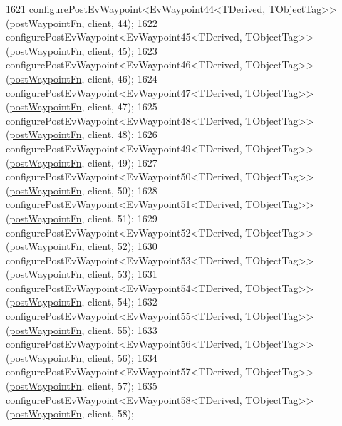 \begin{DoxyCode}
1621     configurePostEvWaypoint<EvWaypoint44<TDerived, TObjectTag>>(\hyperlink{classsmacc_1_1WaypointEventDispatcher_a6bccf6a93a827634b7b5e67ac0e4ec57}{postWaypointFn}, client, 44);
1622     configurePostEvWaypoint<EvWaypoint45<TDerived, TObjectTag>>(\hyperlink{classsmacc_1_1WaypointEventDispatcher_a6bccf6a93a827634b7b5e67ac0e4ec57}{postWaypointFn}, client, 45);
1623     configurePostEvWaypoint<EvWaypoint46<TDerived, TObjectTag>>(\hyperlink{classsmacc_1_1WaypointEventDispatcher_a6bccf6a93a827634b7b5e67ac0e4ec57}{postWaypointFn}, client, 46);
1624     configurePostEvWaypoint<EvWaypoint47<TDerived, TObjectTag>>(\hyperlink{classsmacc_1_1WaypointEventDispatcher_a6bccf6a93a827634b7b5e67ac0e4ec57}{postWaypointFn}, client, 47);
1625     configurePostEvWaypoint<EvWaypoint48<TDerived, TObjectTag>>(\hyperlink{classsmacc_1_1WaypointEventDispatcher_a6bccf6a93a827634b7b5e67ac0e4ec57}{postWaypointFn}, client, 48);
1626     configurePostEvWaypoint<EvWaypoint49<TDerived, TObjectTag>>(\hyperlink{classsmacc_1_1WaypointEventDispatcher_a6bccf6a93a827634b7b5e67ac0e4ec57}{postWaypointFn}, client, 49);
1627     configurePostEvWaypoint<EvWaypoint50<TDerived, TObjectTag>>(\hyperlink{classsmacc_1_1WaypointEventDispatcher_a6bccf6a93a827634b7b5e67ac0e4ec57}{postWaypointFn}, client, 50);
1628     configurePostEvWaypoint<EvWaypoint51<TDerived, TObjectTag>>(\hyperlink{classsmacc_1_1WaypointEventDispatcher_a6bccf6a93a827634b7b5e67ac0e4ec57}{postWaypointFn}, client, 51);
1629     configurePostEvWaypoint<EvWaypoint52<TDerived, TObjectTag>>(\hyperlink{classsmacc_1_1WaypointEventDispatcher_a6bccf6a93a827634b7b5e67ac0e4ec57}{postWaypointFn}, client, 52);
1630     configurePostEvWaypoint<EvWaypoint53<TDerived, TObjectTag>>(\hyperlink{classsmacc_1_1WaypointEventDispatcher_a6bccf6a93a827634b7b5e67ac0e4ec57}{postWaypointFn}, client, 53);
1631     configurePostEvWaypoint<EvWaypoint54<TDerived, TObjectTag>>(\hyperlink{classsmacc_1_1WaypointEventDispatcher_a6bccf6a93a827634b7b5e67ac0e4ec57}{postWaypointFn}, client, 54);
1632     configurePostEvWaypoint<EvWaypoint55<TDerived, TObjectTag>>(\hyperlink{classsmacc_1_1WaypointEventDispatcher_a6bccf6a93a827634b7b5e67ac0e4ec57}{postWaypointFn}, client, 55);
1633     configurePostEvWaypoint<EvWaypoint56<TDerived, TObjectTag>>(\hyperlink{classsmacc_1_1WaypointEventDispatcher_a6bccf6a93a827634b7b5e67ac0e4ec57}{postWaypointFn}, client, 56);
1634     configurePostEvWaypoint<EvWaypoint57<TDerived, TObjectTag>>(\hyperlink{classsmacc_1_1WaypointEventDispatcher_a6bccf6a93a827634b7b5e67ac0e4ec57}{postWaypointFn}, client, 57);
1635     configurePostEvWaypoint<EvWaypoint58<TDerived, TObjectTag>>(\hyperlink{classsmacc_1_1WaypointEventDispatcher_a6bccf6a93a827634b7b5e67ac0e4ec57}{postWaypointFn}, client, 58);

\end{DoxyCode}
